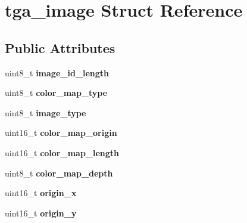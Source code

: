 \hypertarget{structtga__image}{\section{tga\-\_\-image Struct Reference}
\label{structtga__image}
}
\subsection*{Public Attributes}
\begin{DoxyCompactItemize}
\item 
\hypertarget{structtga__image_a5cab1a698dcd5e4866997f1774bb3cc4}{uint8\-\_\-t {\bfseries image\-\_\-id\-\_\-length}}\label{structtga__image_a5cab1a698dcd5e4866997f1774bb3cc4}

\item 
\hypertarget{structtga__image_a45fbfcb14489f00099b35409e34f6cf2}{uint8\-\_\-t {\bfseries color\-\_\-map\-\_\-type}}\label{structtga__image_a45fbfcb14489f00099b35409e34f6cf2}

\item 
\hypertarget{structtga__image_adf9f4b49da5ce03d7364c83b42480fe3}{uint8\-\_\-t {\bfseries image\-\_\-type}}\label{structtga__image_adf9f4b49da5ce03d7364c83b42480fe3}

\item 
\hypertarget{structtga__image_acf251fb02f6128c4808b24fddb331a7d}{uint16\-\_\-t {\bfseries color\-\_\-map\-\_\-origin}}\label{structtga__image_acf251fb02f6128c4808b24fddb331a7d}

\item 
\hypertarget{structtga__image_a200c9ac934e22d6777ae3bf947cef19d}{uint16\-\_\-t {\bfseries color\-\_\-map\-\_\-length}}\label{structtga__image_a200c9ac934e22d6777ae3bf947cef19d}

\item 
\hypertarget{structtga__image_aa13eef4443b1ea39389a0cf9c9bb9805}{uint8\-\_\-t {\bfseries color\-\_\-map\-\_\-depth}}\label{structtga__image_aa13eef4443b1ea39389a0cf9c9bb9805}

\item 
\hypertarget{structtga__image_ace037ad971b4b52da269891621b805db}{uint16\-\_\-t {\bfseries origin\-\_\-x}}\label{structtga__image_ace037ad971b4b52da269891621b805db}

\item 
\hypertarget{structtga__image_a11c258cbfc20d8087ffe4e6b8ef4d40f}{uint16\-\_\-t {\bfseries origin\-\_\-y}}\label{structtga__image_a11c258cbfc20d8087ffe4e6b8ef4d40f}


\end{DoxyCompactItemize}
